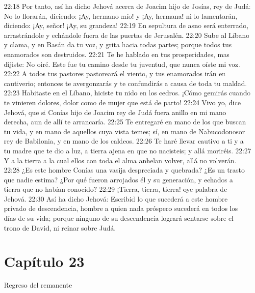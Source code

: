 22:18 Por tanto, así ha dicho Jehová acerca de Joacim hijo de Josías, rey de Judá: No lo llorarán, diciendo: ¡Ay, hermano mío! y ¡Ay, hermana! ni lo lamentarán, diciendo: ¡Ay, señor! ¡Ay, su grandeza! 
22:19 En sepultura de asno será enterrado, arrastrándole y echándole fuera de las puertas de Jerusalén. 
22:20 Sube al Líbano y clama, y en Basán da tu voz, y grita hacia todas partes; porque todos tus enamorados son destruidos. 
22:21 Te he hablado en tus prosperidades, mas dijiste: No oiré. Este fue tu camino desde tu juventud, que nunca oíste mi voz. 
22:22 A todos tus pastores pastoreará el viento, y tus enamorados irán en cautiverio; entonces te avergonzarás y te confundirás a causa de toda tu maldad. 
22:23 Habitaste en el Líbano, hiciste tu nido en los cedros. ¡Cómo gemirás cuando te vinieren dolores, dolor como de mujer que está de parto! 
22:24 Vivo yo, dice Jehová, que si Conías hijo de Joacim rey de Judá fuera anillo en mi mano derecha, aun de allí te arrancaría. 
22:25 Te entregaré en mano de los que buscan tu vida, y en mano de aquellos cuya vista temes; sí, en mano de Nabucodonosor rey de Babilonia, y en mano de los caldeos. 
22:26 Te haré llevar cautivo a ti y a tu madre que te dio a luz, a tierra ajena en que no nacisteis; y allá moriréis. 
22:27 Y a la tierra a la cual ellos con toda el alma anhelan volver, allá no volverán. 
22:28 ¿Es este hombre Conías una vasija despreciada y quebrada? ¿Es un trasto que nadie estima? ¿Por qué fueron arrojados él y su generación, y echados a tierra que no habían conocido? 
22:29 ¡Tierra, tierra, tierra! oye palabra de Jehová. 
22:30 Así ha dicho Jehová: Escribid lo que sucederá a este hombre privado de descendencia, hombre a quien nada próspero sucederá en todos los días de su vida; porque ninguno de su descendencia logrará sentarse sobre el trono de David, ni reinar sobre Judá. 
\section*{Capítulo 23 }
Regreso del remanente 
 
